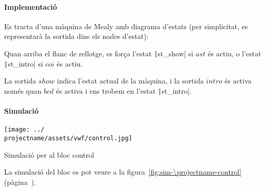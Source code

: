 \paragraph{Implementació}




Es tracta d'una màquina de Mealy amb diagrama d'estats (per simplicitat, es
representarà la sortida dins els nodes d'estat):

\begin{center}  \end{center}

Quan arriba el flanc de rellotge, es força l'estat \texttt|st_show| si $ast$ és
actiu, o l'estat \texttt|st_intro| si $coi$ és actiu.

La sortida $show$ indica l'estat actual de la màquina, i la sortida $intro$ és activa
només quan $bcd$ és activa i ens trobem en l'estat \texttt|st_intro|.

\paragraph{Simulació}

\begin{contendfig}
  \begin{center}
    \texttt{[image: ../\\projectname/assets/vwf/control.jpg]}
  \end{center}
  \caption{\label{fig:sim-\projectname-control} Simulació per al bloc \textsf{control}}
\end{contendfig}

La simulació del bloc es pot veure a la figura~\ref{fig:sim-\projectname-control} (pàgina~\pageref{fig:sim-\projectname-control}).


\vspace{1cm}

